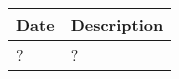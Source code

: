 \begin{center}
    {\renewcommand{\arraystretch}{2.4}%
    \begin{tabular}{L{2cm}L{14cm}}
        \hline
        \textbf{Date} & \textbf{Description} \\
        \hline
        ? & ? \\
        \hline
    \end{tabular}}
\end{center}